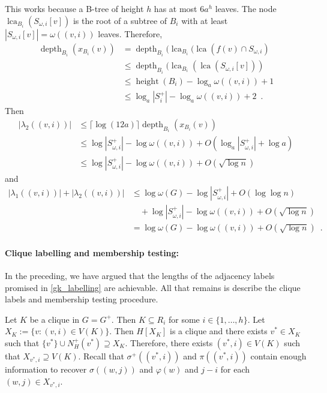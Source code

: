 \documentclass{patmorin}
\DeclareMathOperator{\height}{height}
\DeclareMathOperator{\depth}{depth}
\renewcommand{\le}{\leqslant}
\DeclareMathOperator{\lca}{lca}
\begin{document}
  This works because a B-tree of height $h$ has at most $6a^h$ leaves.
  The node $\lca_{B_i}(S_{\omega,i}[v])$ is the root of a subtree of $B_i$ with at least $|S_{\omega,i}[v]|=\omega((v,i))$ leaves.  Therefore,
  \begin{align*}
     \depth_{B_i}(x_{B_i}(v))
     & =
     \depth_{B_i}(\lca_{B_i}(\lca(f(v)\cap S_{\omega,i}) \\
     & \le
     \depth_{B_i}(\lca_{B_i}(\lca(S_{\omega,i}[v])) \\
     & \le\height(B_i)-\log_a\omega((v,i))+1 \\
     & \le \log_a|S^+_i| - \log_a\omega((v,i)) + 2 \enspace .
  \end{align*}
  Then
  \begin{align*}
     |\lambda_2((v,i))|
     & \le \lceil \log(12a)\rceil \depth_{B_i}(x_{B_i}(v)) \\
     & \le \log |S^+_{\omega,i}|-\log \omega((v,i)) + O(\log_a|S^+_{\omega,i}|+ \log a) \\
     & \le \log |S^+_{\omega,i}|-\log \omega((v,i)) + O(\sqrt{\log n})
  \end{align*}
  and
  \begin{align*}
     |\lambda_1((v,i))|+|\lambda_2((v,i))|
     & \le \log\omega(G) - \log |S^+_{\omega,i}| + O(\log\log n) \\
     & \quad {} + \log |S^+_{\omega,i}|-\log \omega((v,i)) + O(\sqrt{\log n}) \\
     & = \log\omega(G) - \log\omega((v,i)) + O(\sqrt{\log n}) \enspace .
  \end{align*}

  \paragraph{Clique labelling and membership testing:}

  In the preceding, we have argued that the lengths of the adjacency labels promised in \cref{gk_labelling} are achievable.  All that remains is describe the clique labels and membership testing procedure.

  Let $K$ be a clique in $G=G^+$.  Then $K\subseteq R_i$ for some $i\in\{1,\ldots,h\}$.  Let $X_K:=\{v: (v,i)\in V(K)\}$.  Then $H[X_K]$ is a clique and there exists $v^*\in X_K$ such that $\{v^*\}\cup N^+_H(v^*)\supseteq X_K$.  Therefore, there exists $(v^*,i)\in V(K)$ such that $X_{v^*,i}\supseteq V(K)$. Recall that $\sigma^+((v^*,i))$ and $\pi((v^*,i))$ contain enough information to recover $\sigma((w,j))$ and $\varphi(w)$ and $j-i$ for each $(w,j)\in X_{v^*,i}$.
\end{document}
